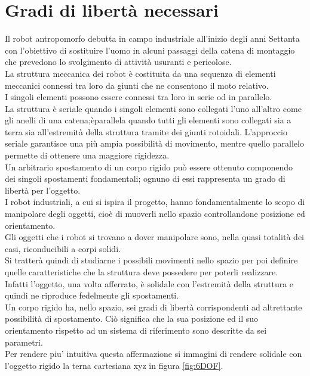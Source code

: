 \documentclass[%
corpo=11pt,
twoside,
 stile=classica,
oldstyle,
greek,%
]{toptesi}
\begin{document}
	\section{Gradi di libertà necessari}
	Il robot antropomorfo debutta in campo industriale all’inizio degli anni Settanta con l’obiettivo di sostituire l’uomo in alcuni passaggi della catena di montaggio che prevedono lo svolgimento di attività usuranti e pericolose. \\
	La struttura meccanica dei robot è costituita da una sequenza di elementi meccanici connessi tra loro da giunti che ne consentono il moto relativo.\\
	 I singoli elementi possono essere connessi tra loro in serie od in parallelo.\\
	 La struttura è seriale quando i singoli elementi sono collegati l'uno all'altro come gli anelli di una catena;èparallela quando tutti gli elementi sono collegati sia a terra sia all'estremità della struttura tramite dei giunti rotoidali. L'approccio seriale garantisce una più ampia possibilità di movimento, mentre quello parallelo permette di ottenere una maggiore rigidezza.\\
	 Un arbitrario spostamento di un corpo rigido può essere ottenuto componendo dei singoli spostamenti fondamentali; ognuno di essi rappresenta un grado di libertà per l'oggetto. \\
	 I robot industriali, a cui si ispira il progetto, hanno fondamentalmente lo scopo di manipolare degli oggetti, cioè di muoverli nello spazio controllandone posizione ed orientamento.\\
	  Gli oggetti che i robot si trovano a dover manipolare sono, nella quasi totalità dei casi, riconducibili a corpi solidi. \\
	  Si tratterà quindi di studiarne i possibili movimenti nello spazio per poi definire quelle caratteristiche che la struttura deve possedere per poterli realizzare. \\
	  Infatti l'oggetto, una volta afferrato, è solidale con l'estremità della struttura e quindi ne riproduce fedelmente gli spostamenti. \\
	 Un corpo rigido ha, nello spazio, sei gradi di libertà corrispondenti ad altrettante possibilità di spostamento. 
	 Ciò significa che la sua posizione ed il suo orientamento rispetto ad un sistema di riferimento sono descritte da sei parametri. \\
	 Per rendere piu' intuitiva questa affermazione si immagini di rendere solidale con l'oggetto rigido la terna cartesiana xyz in figura \ref{fig:6DOF}. \\
\end{document}

